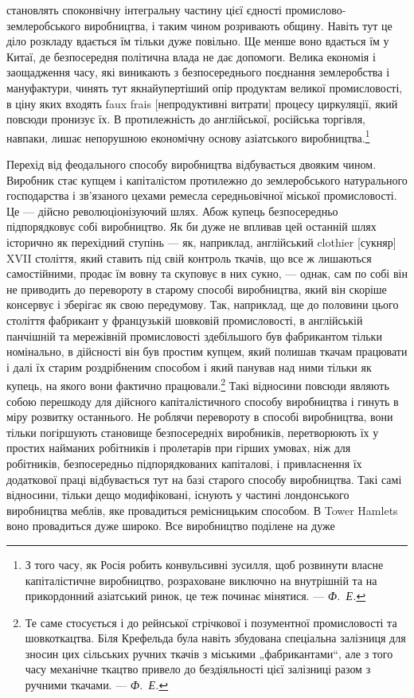 \parcont{}  %
становлять споконвічну інтегральну частину цієї єдності промислово-землеробського
виробництва, і таким чином розривають
общину. Навіть тут це діло розкладу вдається їм тільки дуже
повільно. Ще менше воно вдається їм у Китаї, де безпосередня
політична влада не дає допомоги. Велика економія і заощадження
часу, які виникають з безпосереднього поєднання землеробства
і мануфактури, чинять тут якнайупертіший опір продуктам
великої промисловості, в ціну яких входять faux frais [непродуктивні
витрати] процесу циркуляції, який повсюди пронизує
їх. В протилежність до англійської, російська торгівля, навпаки,
лишає непорушною економічну основу азіатського виробництва.\footnote{
З того часу, як Росія робить конвульсивні зусилля, щоб розвинути
власне капіталістичне виробництво, розраховане виключно на внутрішній та
на прикордонний азіатський ринок, це теж починає мінятися. — \emph{Ф.~Е.}
}

Перехід від феодального способу виробництва відбувається
двояким чином. Виробник стає купцем і капіталістом протилежно
до землеробського натурального господарства і зв’язаного цехами
ремесла середньовічної міської промисловості. Це — дійсно
революціонізуючий шлях. Абож купець безпосередньо підпорядковує
собі виробництво. Як би дуже не впливав цей останній
шлях історично як перехідний ступінь — як, наприклад, англійський
clothier [сукняр] XVII століття, який ставить під свій контроль
ткачів, що все ж лишаються самостійними, продає їм вовну
та скуповує в них сукно, — однак, сам по собі він не приводить
до перевороту в старому способі виробництва, який він скоріше
консервує і зберігає як свою передумову. Так, наприклад, ще
до половини цього століття фабрикант у французькій шовковій
промисловості, в англійській панчішній та мережівній промисловості
здебільшого був фабрикантом тільки номінально, в дійсності
він був простим купцем, який полишав ткачам працювати
і далі їх старим роздрібненим способом і який панував над ними
тільки як купець, на якого вони фактично працювали.\footnote{
Те саме стосується і до рейнської стрічкової і позументної промисловості
та шовкоткацтва. Біля Крефельда була навіть збудована спеціальна залізниця
для зносин цих сільських ручних ткачів з міськими „фабрикантами“, але
з того часу механічне ткацтво привело до бездіяльності цієї залізниці разом
з ручними ткачами. — \emph{Ф.~Е.}
} Такі
відносини повсюди являють собою перешкоду для дійсного капіталістичного
способу виробництва і гинуть в міру розвитку останнього.
Не роблячи перевороту в способі виробництва, вони тільки
погіршують становище безпосередніх виробників, перетворюють
їх у простих найманих робітників і пролетарів при гірших умовах,
ніж для робітників, безпосередньо підпорядкованих капіталові,
і привласнення їх додаткової праці відбувається тут на базі старого
способу виробництва. Такі самі відносини, тільки дещо модифіковані,
існують у частині лондонського виробництва меблів,
яке провадиться ремісницьким способом. В Tower Hamlets воно
провадиться дуже широко. Все виробництво поділене на дуже
\parbreak{}  %
